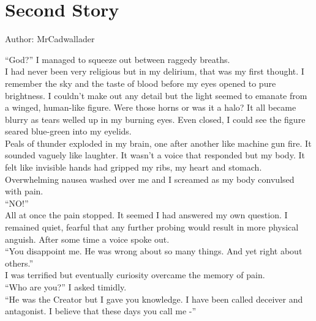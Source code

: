 \chapter{Second Story}

Author: MrCadwallader

\enquote{God?} I managed to squeeze out between raggedy breaths. \\



I had never been very religious but in my delirium, that was my first thought. I remember the sky and the taste of blood before my eyes opened to pure brightness. I couldn't make out any detail but the light seemed to emanate from a winged, human-like figure. Were those horns or was it a halo? It all became blurry as tears welled up in my burning eyes. Even closed, I could see the figure seared blue-green into my eyelids.\\



Peals of thunder exploded in my brain, one after another like machine gun fire. It sounded vaguely like laughter. It wasn't a voice that responded but my body. It felt like invisible hands had gripped my ribs, my heart and stomach. Overwhelming nausea washed over me and I screamed as my body convulsed with pain.\\



\enquote{NO!}\\



All at once the pain stopped. It seemed I had answered my own question. I remained quiet, fearful that any further probing would result in more physical anguish. After some time a voice spoke out.\\



\enquote{You disappoint me. He was wrong about so many things. And yet right about others.}\\



I was terrified but eventually curiosity overcame the memory of pain. \\



\enquote{Who are you?} I asked timidly.\\



\enquote{He was the Creator but I gave you knowledge. I have been called deceiver and antagonist. I believe that these days you call me -}\\



